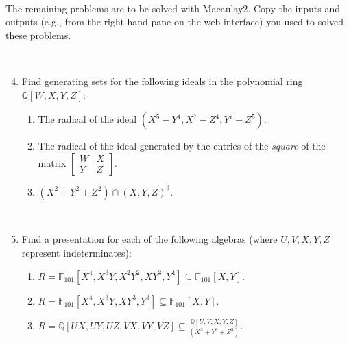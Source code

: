 \documentclass[12pt]{amsart}
\newcommand{\Q}{\mathbb{Q}}
\newcommand{\F}{\mathbb{F}}
\begin{document}
\


The remaining problems are to be solved with Macaulay2. Copy the inputs and outputs (e.g., from the right-hand pane on the web interface) you used to solved these problems.

\

\begin{enumerate}\setcounter{enumi}{3}


\item Find generating sets for the following ideals in the polynomial ring $\Q[W,X,Y,Z]$:
\begin{enumerate}
\item The radical of the ideal $(X^5-Y^4,X^7-Z^4,Y^7-Z^5)$.
\item The radical of the ideal generated by the entries of the \emph{square} of the matrix $\begin{bmatrix} W & X \\ Y& Z\end{bmatrix}$.
\item $(X^2+Y^2+Z^2) \cap (X,Y,Z)^3$.
\end{enumerate}

\

\item Find a presentation for each of the following algebras (where $U,V,X,Y,Z$ represent indeterminates):
\begin{enumerate}
\item $R=\F_{101}[X^4,X^3Y,X^2Y^2,XY^3,Y^4]\subseteq \F_{101}[X,Y]$.
\item  $R=\F_{101}[X^4,X^3Y,XY^3,Y^3]\subseteq \F_{101}[X,Y]$.
\item  $\displaystyle R=\Q[UX,UY,UZ,VX,VY,VZ]\subseteq \frac{\Q[U,V,X,Y,Z]}{(X^3+Y^3+Z^3)}$.
\end{enumerate}

\



\end{enumerate}
\end{document}
